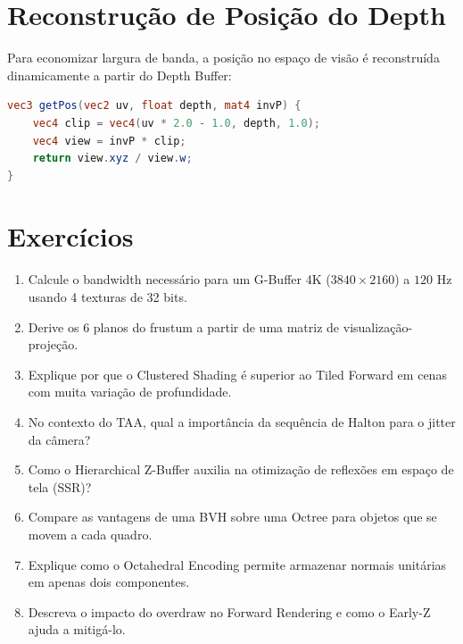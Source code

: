 \section{Reconstrução de Posição do Depth}

Para economizar largura de banda, a posição no espaço de visão é reconstruída dinamicamente a partir do Depth Buffer:

\begin{lstlisting}[language=GLSL]
vec3 getPos(vec2 uv, float depth, mat4 invP) {
    vec4 clip = vec4(uv * 2.0 - 1.0, depth, 1.0);
    vec4 view = invP * clip;
    return view.xyz / view.w;
}
\end{lstlisting}

\section*{Exercícios}

\begin{enumerate}
    \item Calcule o bandwidth necessário para um G-Buffer 4K ($3840 \times 2160$) a $120$ Hz usando 4 texturas de 32 bits.
    \item Derive os 6 planos do frustum a partir de uma matriz de visualização-projeção.
    \item Explique por que o Clustered Shading é superior ao Tiled Forward em cenas com muita variação de profundidade.
    \item No contexto do TAA, qual a importância da sequência de Halton para o jitter da câmera?
    \item Como o Hierarchical Z-Buffer auxilia na otimização de reflexões em espaço de tela (SSR)?
    \item Compare as vantagens de uma BVH sobre uma Octree para objetos que se movem a cada quadro.
    \item Explique como o Octahedral Encoding permite armazenar normais unitárias em apenas dois componentes.
    \item Descreva o impacto do overdraw no Forward Rendering e como o Early-Z ajuda a mitigá-lo.
\end{enumerate}

\textcite{shirley2021fundamentals}
\textcite{akenine2018realtime}
\textcite{pharr2016pbr}
\textcite{kajiya1986rendering}
\textcite{foley1995computer}
